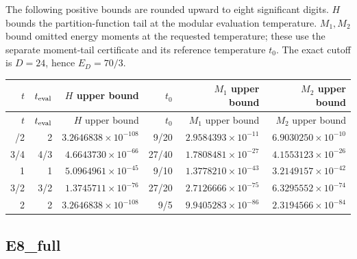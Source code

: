 \endgroup
The following positive bounds are rounded upward to eight significant
digits. $H$ bounds the partition-function tail at the modular evaluation
temperature. $M_1,M_2$ bound omitted energy moments at the requested
temperature; these use the separate moment-tail certificate and its
reference temperature $t_0$. The exact cutoff is $D=24$, hence
$E_D=70/3$.

\begingroup\scriptsize
\setlength{\tabcolsep}{5pt}
\begin{longtable}{@{}rrrrrr@{}}
\toprule
$t$ & $t_{\rm eval}$ & $H$ upper bound & $t_0$ & $M_1$ upper bound & $M_2$ upper bound\\
\midrule\endfirsthead
\toprule
$t$ & $t_{\rm eval}$ & $H$ upper bound & $t_0$ & $M_1$ upper bound & $M_2$ upper bound\\
\midrule\endhead
\bottomrule\endfoot
1/2 & 2 & $3.2646838\times10^{-108}$ & 9/20 & $2.9584393\times10^{-11}$ & $6.9030250\times10^{-10}$\\
3/4 & 4/3 & $4.6643730\times10^{-66}$ & 27/40 & $1.7808481\times10^{-27}$ & $4.1553123\times10^{-26}$\\
1 & 1 & $5.0964961\times10^{-45}$ & 9/10 & $1.3778210\times10^{-43}$ & $3.2149157\times10^{-42}$\\
3/2 & 3/2 & $1.3745711\times10^{-76}$ & 27/20 & $2.7126666\times10^{-75}$ & $6.3295552\times10^{-74}$\\
2 & 2 & $3.2646838\times10^{-108}$ & 9/5 & $9.9405283\times10^{-86}$ & $2.3194566\times10^{-84}$\\
\end{longtable}
\endgroup
\subsection{E8\_full}

